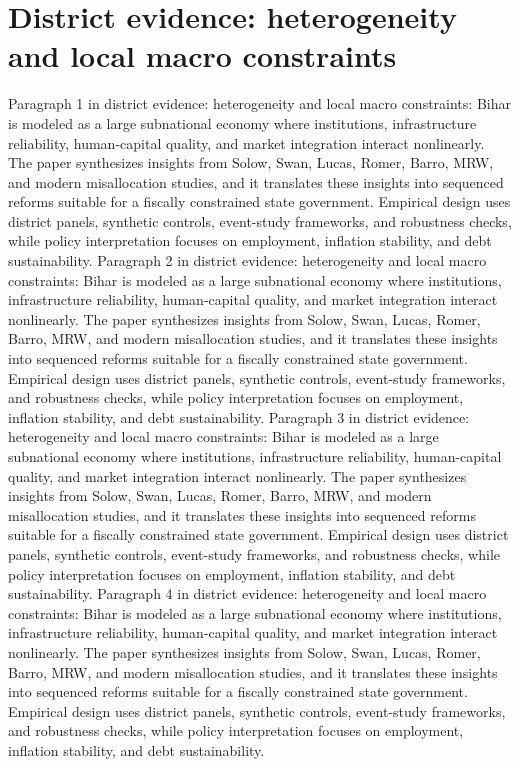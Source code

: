\documentclass[preprint,12pt]{elsarticle}
\begin{document}
\section{District evidence: heterogeneity and local macro constraints}
Paragraph 1 in district evidence: heterogeneity and local macro constraints: Bihar is modeled as a large subnational economy where institutions, infrastructure reliability, human-capital quality, and market integration interact nonlinearly. The paper synthesizes insights from Solow, Swan, Lucas, Romer, Barro, MRW, and modern misallocation studies, and it translates these insights into sequenced reforms suitable for a fiscally constrained state government. Empirical design uses district panels, synthetic controls, event-study frameworks, and robustness checks, while policy interpretation focuses on employment, inflation stability, and debt sustainability.
Paragraph 2 in district evidence: heterogeneity and local macro constraints: Bihar is modeled as a large subnational economy where institutions, infrastructure reliability, human-capital quality, and market integration interact nonlinearly. The paper synthesizes insights from Solow, Swan, Lucas, Romer, Barro, MRW, and modern misallocation studies, and it translates these insights into sequenced reforms suitable for a fiscally constrained state government. Empirical design uses district panels, synthetic controls, event-study frameworks, and robustness checks, while policy interpretation focuses on employment, inflation stability, and debt sustainability.
Paragraph 3 in district evidence: heterogeneity and local macro constraints: Bihar is modeled as a large subnational economy where institutions, infrastructure reliability, human-capital quality, and market integration interact nonlinearly. The paper synthesizes insights from Solow, Swan, Lucas, Romer, Barro, MRW, and modern misallocation studies, and it translates these insights into sequenced reforms suitable for a fiscally constrained state government. Empirical design uses district panels, synthetic controls, event-study frameworks, and robustness checks, while policy interpretation focuses on employment, inflation stability, and debt sustainability.
Paragraph 4 in district evidence: heterogeneity and local macro constraints: Bihar is modeled as a large subnational economy where institutions, infrastructure reliability, human-capital quality, and market integration interact nonlinearly. The paper synthesizes insights from Solow, Swan, Lucas, Romer, Barro, MRW, and modern misallocation studies, and it translates these insights into sequenced reforms suitable for a fiscally constrained state government. Empirical design uses district panels, synthetic controls, event-study frameworks, and robustness checks, while policy interpretation focuses on employment, inflation stability, and debt sustainability.
\end{document}
